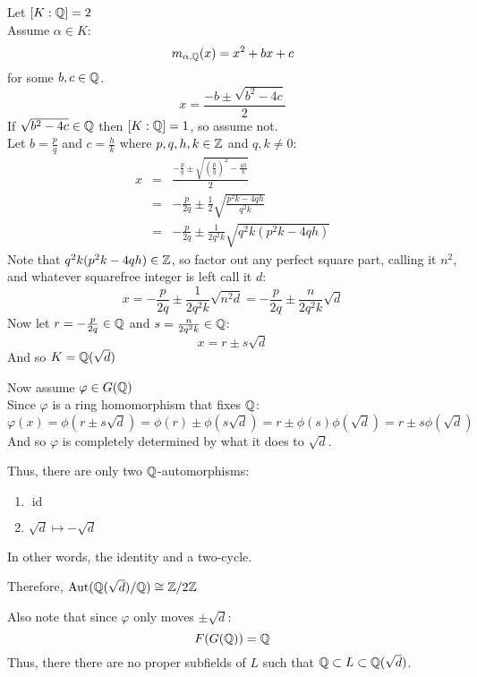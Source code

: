 \documentclass[letterpaper,12pt,fleqn]{article}
\renewcommand{\a}{\alpha}
\newcommand{\vp}{\varphi}
\DeclareMathOperator{\Aut}{Aut}
\DeclareMathOperator{\id}{id}
\begin{document}
\begin{example}
  Let $[K:\mathbb{Q}]=2$ \\
  Assume $\a\in K$:
  \[m_{\a,\Q}(x)=x^2+bx+c\]
  for some $b,c\in\mathbb{Q}$.
  \[x=\frac{-b\pm\sqrt{b^2-4c}}{2}\]
  If $\sqrt{b^2-4c}\in\mathbb{Q}$ then $[K:\mathbb{Q}]=1$, so assume not. \\
  Let $b=\frac{p}{q}$ and $c=\frac{h}{k}$ where $p,q,h,k\in\mathbb{Z}$ and $q,k\ne0$:
  \begin{eqnarray*}
    x &=& \frac{-\frac{p}{q}\pm\sqrt{\left(\frac{p}{q}\right)^2-\frac{4h}{k}}}{2} \\
    &=& -\frac{p}{2q}\pm\frac{1}{2}\sqrt{\frac{p^2k-4qh}{q^2k}} \\
    &=& -\frac{p}{2q}\pm\frac{1}{2q^2k}\sqrt{q^2k(p^2k-4qh)}
  \end{eqnarray*}
  Note that $q^2k(p^2k-4qh)\in\mathbb{Z}$, so factor out any perfect square part, calling it
  $n^2$, and whatever squarefree integer is left call it $d$:
  \[x=-\frac{p}{2q}\pm\frac{1}{2q^2k}\sqrt{n^2d}=
  -\frac{p}{2q}\pm\frac{n}{2q^2k}\sqrt{d}\]
  Now let $r=-\frac{p}{2q}\in\mathbb{Q}$ and $s=\frac{n}{2q^2k}\in\mathbb{Q}$:
  \[x=r\pm s\sqrt{d}\]
  And so $K=\mathbb{Q}(\sqrt{d})$

  Now assume $\vp\in G(\Q)$ \\
  Since $\vp$ is a ring homomorphism that fixes $\mathbb{Q}$:
  \[\vp(x)=\phi(r\pm s\sqrt{d})=\phi(r)\pm\phi(s\sqrt{d})=r\pm\phi(s)\phi(\sqrt{d})=
  r\pm s\phi(\sqrt{d})\]
  And so $\vp$ is completely determined by what it does to $\sqrt{d}$.
  
  Thus, there are only two $\mathbb{Q}$-automorphisms:
  \begin{enumerate}
  \item $\id$
  \item $\sqrt{d}\mapsto -\sqrt{d}$
  \end{enumerate}
  In other words, the identity and a two-cycle.

  Therefore, $\Aut(\Q(\sqrt{d})/\Q)\cong \Z/2\Z$

  Also note that since $\vp$ only moves $\pm\sqrt{d}$:
  \[F(G(\mathbb{Q}))=\mathbb{Q}\]
  Thus, there there are no proper subfields of $L$ such that
  $\mathbb{Q}\subset L\subset \mathbb{Q}(\sqrt{d})$.
\end{example}
\end{document}
